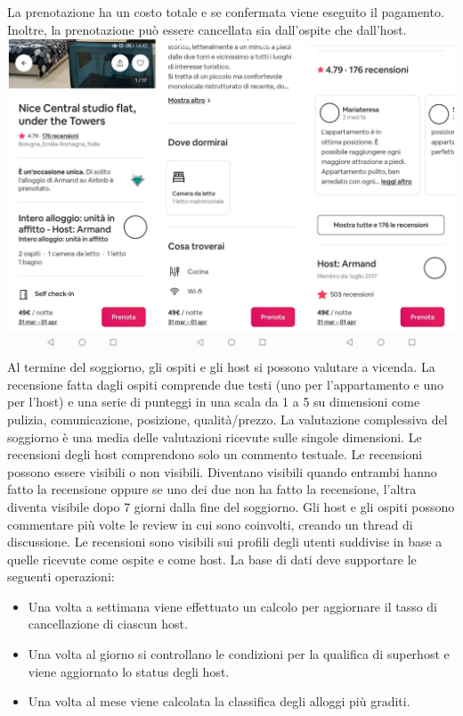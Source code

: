 La prenotazione ha un costo totale e se confermata viene eseguito il pagamento. Inoltre, la
prenotazione può essere cancellata sia dall’ospite che dall’host.
\newline
\includegraphics[width=\textwidth]{resources/airbnb.png}
\newline
Al termine del soggiorno, gli ospiti e gli host si possono valutare a vicenda. La recensione
fatta dagli ospiti comprende due testi (uno per l’appartamento e uno per l’host) e una serie di
punteggi in una scala da 1 a 5 su dimensioni come pulizia, comunicazione, posizione,
qualità/prezzo. La valutazione complessiva del soggiorno è una media delle valutazioni
ricevute sulle singole dimensioni. Le recensioni degli host comprendono solo un commento
testuale. Le recensioni possono essere visibili o non visibili. Diventano visibili quando
entrambi hanno fatto la recensione oppure se uno dei due non ha fatto la recensione, l’altra
diventa visibile dopo 7 giorni dalla fine del soggiorno. Gli host e gli ospiti possono
commentare più volte le review in cui sono coinvolti, creando un thread di discussione.
Le recensioni sono visibili sui profili degli utenti suddivise in base a quelle ricevute come
ospite e come host. La base di dati deve supportare le seguenti operazioni:
\begin{itemize}
    \item Una volta a settimana viene effettuato un calcolo per aggiornare il tasso di
    cancellazione di ciascun host.
    \item Una volta al giorno si controllano le condizioni per la qualifica di superhost e viene
    aggiornato lo status degli host.
    \item Una volta al mese viene calcolata la classifica degli alloggi più graditi.
\end{itemize}
